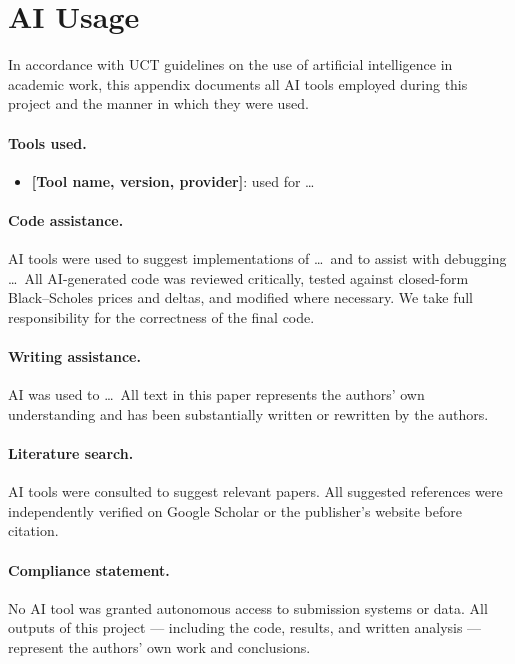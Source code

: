 
\section{AI Usage}
\label{app:ai}

In accordance with UCT guidelines on the use of artificial intelligence in academic
work, this appendix documents all AI tools employed during this project and the manner
in which they were used.

\paragraph{Tools used.}
\begin{itemize}
    \item \textbf{[Tool name, version, provider]}: used for \ldots
\end{itemize}

\paragraph{Code assistance.}
AI tools were used to suggest implementations of \ldots\ and to assist with
debugging \ldots\ All AI-generated code was reviewed critically, tested against
closed-form Black--Scholes prices and deltas, and modified where necessary. We take
full responsibility for the correctness of the final code.

\paragraph{Writing assistance.}
AI was used to \ldots\ All text in this paper represents the authors' own understanding
and has been substantially written or rewritten by the authors.

\paragraph{Literature search.}
AI tools were consulted to suggest relevant papers. All suggested references were
independently verified on Google Scholar or the publisher's website before citation.

\paragraph{Compliance statement.}
No AI tool was granted autonomous access to submission systems or data. All outputs
of this project --- including the code, results, and written analysis --- represent
the authors' own work and conclusions.
